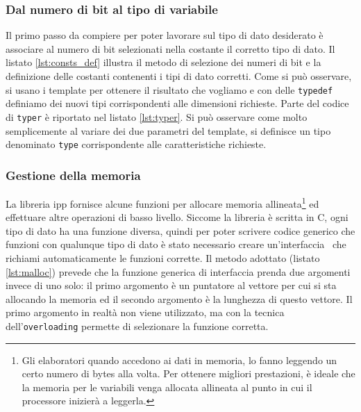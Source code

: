 \subsubsection{Dal numero di bit al tipo di variabile}
Il primo passo da compiere per poter lavorare sul tipo di dato desiderato \`e
associare al numero di bit selezionati nella costante il corretto tipo di dato.
Il listato \ref{lst:consts_def} illustra il metodo di selezione dei numeri di bit e
la definizione delle costanti contenenti i tipi di dato corretti. Come si pu\`o
osservare, si usano i template per ottenere il risultato che vogliamo e con
delle \texttt{typedef} definiamo dei nuovi tipi corrispondenti alle dimensioni
richieste. Parte del codice di \texttt{typer} \`e riportato nel listato
\ref{lst:typer}. Si pu\`o osservare come molto semplicemente al variare dei due
parametri del template, si definisce un tipo denominato \texttt{type}
corrispondente alle caratteristiche richieste.





\subsubsection{Gestione della memoria}
La libreria \ac{ipp} fornisce alcune funzioni per allocare memoria
allineata\footnote{Gli elaboratori quando accedono ai dati in memoria, lo fanno
leggendo un certo numero di bytes alla volta. Per ottenere migliori
prestazioni, \`e ideale che la memoria per le variabili venga allocata
allineata al punto in cui il processore inizier\`a a leggerla.} ed effettuare
altre operazioni di basso livello. Siccome la libreria \`e scritta in C, ogni
tipo di dato ha una funzione diversa, quindi per poter scrivere codice generico
che funzioni con qualunque tipo di dato \`e stato necessario creare
un'interfaccia \CC\, che richiami automaticamente le funzioni corrette. Il metodo
adottato (listato \ref{lst:malloc}) prevede che la funzione generica di
interfaccia prenda due argomenti invece di uno solo: il primo argomento \`e un
puntatore al vettore per cui si sta allocando la memoria ed il secondo
argomento \`e la lunghezza di questo vettore. Il primo argomento in realt\`a
non viene utilizzato, ma con la tecnica dell'\texttt{overloading} permette di
selezionare la funzione corretta.

